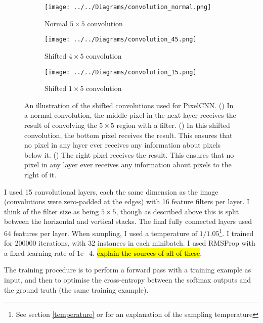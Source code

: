 \documentclass[11pt, a4paper]{book}
\begin{document}
\begin{figure}
  \centering
    \begin{subfigure}{0.3\columnwidth}
        \centering
        \caption{Normal $5\times 5$ convolution}
        \texttt{[image: ../../Diagrams/convolution\_normal.png]} 
        \label{convolutions:normal}
    \end{subfigure}
    \hfill
    \begin{subfigure}{0.3\columnwidth}
        \centering
        \caption{Shifted $4\times 5$ convolution}
        \texttt{[image: ../../Diagrams/convolution\_45.png]} 
        \label{convolutions:45}
    \end{subfigure}
    \hfill
    \begin{subfigure}{0.3\columnwidth}
        \centering
        \caption{Shifted $1\times 5$ convolution}
        \texttt{[image: ../../Diagrams/convolution\_15.png]} 
        \label{convolutions:15}
    \end{subfigure}
  \caption[Shifted convolutions]{An illustration of the shifted convolutions used for PixelCNN. (\protect{}) In a normal convolution, the middle pixel in the next layer receives the result of convolving the $5\times 5$ region with a filter. () In this shifted convolution, the bottom pixel receives the result. This ensures that no pixel in any layer ever receives any information about pixels below it. () The right pixel receives the result. This ensures that no pixel in any layer ever receives any information about pixels to the right of it.}
  \label{convolutions}
\end{figure}

I used 15 convolutional layers, each the same dimension as the image (convolutions were zero-padded at the edges) with 16 feature filters per layer. I think of the filter size as being $5\times 5$, though as described above this is split between the horizontal and vertical stacks. The final fully connected layers used 64 features per layer. When sampling, I used a temperature of $1/1.05$\footnote{See section \ref{temperature} or \citet{pixelcnn2} for an explanation of the sampling temperature}. I trained for 200000 iterations, with 32 instances in each minibatch. I used RMSProp with a fixed learning rate of $1\mathrm{e}{-4}$. \hl{explain the sources of all of these}.

The training procedure is to perform a forward pass with a training example as input, and then to optimise the cross-entropy between the softmax outputs and the ground truth (the same training example).
\end{document}
